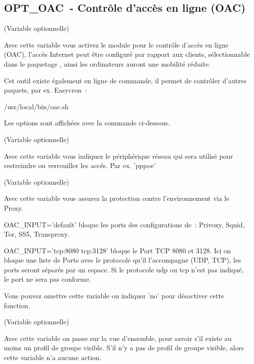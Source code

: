 \subsection{OPT\_OAC~- Contrôle d'accès en ligne (OAC)}

\begin{description}

 (Variable optionnelle)

    Avec cette variable vous activez le module pour le contrôle d'accès en ligne
    (OAC), l'accès Internet peut être configuré par rapport aux clients,
    sélectionnable dans le paquetage , ainsi les
    ordinateurs auront une mobilité réduite.

    Cet outil existe également en ligne de commande, il permet de contrôler
    d'autres paquets, par ex. Easycron~:

    /usr/local/bin/oac.sh

    Les options sont affichées avec la commande ci-dessous.

 (Variable optionnelle)

    Avec cette variable vous indiquez le périphérique réseau qui sera utilisé
    pour restreindre ou verrouiller les accés. Par ex. 'pppoe'

 (Variable optionnelle)

    Avec cette variable vous assurez la protection contre l'environnement via
    le Proxy.

    OAC\_INPUT='default' bloque les ports des configurations de~:
    Privoxy, Squid, Tor, SS5, Transproxy.

    OAC\_INPUT='tcp:8080 tcp:3128' bloque le Port TCP 8080 et 3128.
    Ici on bloque une liste de Ports avec le protocole qu'il l'accompagne
    (UDP, TCP), les ports seront séparés par un espace. Si le protocole udp ou tcp
    n'est pas indiqué, le port ne sera pas conforme.

    Vous pouvez omettre cette variable ou indiquer 'no' pour désactiver cette
    fonction.

 (Variable optionnelle)

    Avec cette variable on passe sur la vue d'ensemble, pour savoir s'il existe
    au moins un profil de groupe visible. S'il n'y a pas de profil de groupe
    visible, alors cette variable n'a aucune action.


\end{description}
